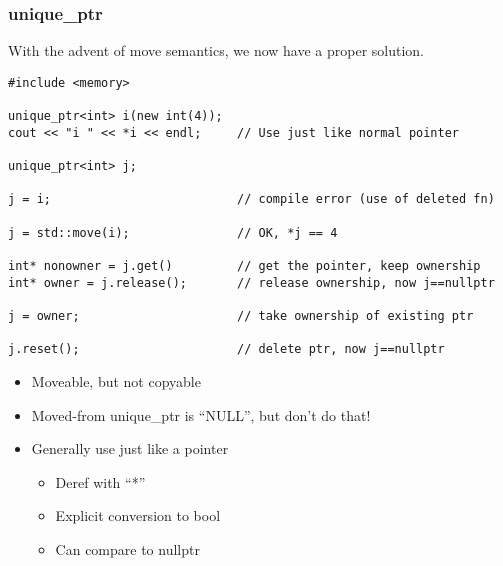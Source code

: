 \begin{frame}[fragile]
\frametitle{unique\_ptr}

With the advent of move semantics, we now have a proper solution.

{\scriptsize\begin{verbatim}
#include <memory>

unique_ptr<int> i(new int(4));
cout << "i " << *i << endl;     // Use just like normal pointer

unique_ptr<int> j;

j = i;                          // compile error (use of deleted fn)

j = std::move(i);               // OK, *j == 4

int* nonowner = j.get()         // get the pointer, keep ownership
int* owner = j.release();       // release ownership, now j==nullptr

j = owner;                      // take ownership of existing ptr

j.reset();                      // delete ptr, now j==nullptr
\end{verbatim}}
\pause{}
\begin{itemize}
\item Moveable, but not copyable
\item Moved-from unique\_ptr is ``NULL'', but don't do that!
\item Generally use just like a pointer
\begin{itemize}
  \item Deref with ``*''
  \item Explicit conversion to bool
  \item Can compare to nullptr
\end{itemize}
\end{itemize}

\end{frame}


